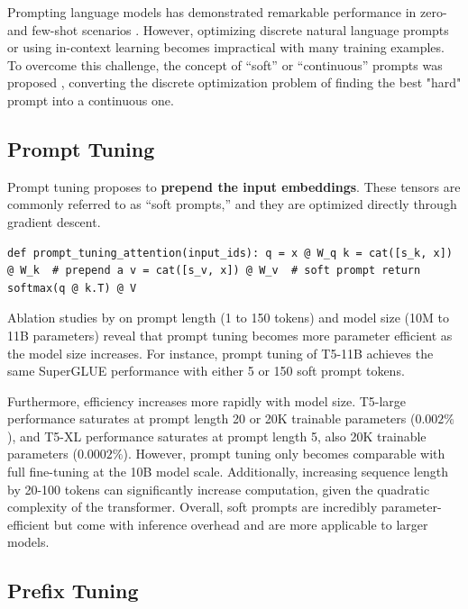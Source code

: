 Prompting language models has demonstrated remarkable performance in zero- and few-shot scenarios \citep{brown2020language_gpt3,pet}. However, optimizing discrete natural language prompts or using in-context learning becomes impractical with many training examples. To overcome this challenge, the concept of ``soft'' or ``continuous'' prompts was proposed \citep{prefix_tuning,prompt_tuning,p_tuning}, converting the discrete optimization problem of finding the best "hard" prompt into a continuous one.

\subsection{Prompt Tuning}
\label{sec:prompt_tuning}

Prompt tuning \citep{prompt_tuning} proposes to \textbf{prepend the input embeddings}. These tensors are commonly referred to as ``soft prompts,'' and they are optimized directly through gradient descent.

\begin{lstlisting}
def prompt_tuning_attention(input_ids): q = x @ W_q k = cat([s_k, x]) @ W_k  # prepend a v = cat([s_v, x]) @ W_v  # soft prompt return softmax(q @ k.T) @ V
\end{lstlisting}

Ablation studies by \citet{promspt_mapping} on prompt length (1 to 150 tokens) and model size (10M to 11B parameters) reveal that prompt tuning becomes more parameter efficient as the model size increases. For instance, prompt tuning of T5-11B achieves the same SuperGLUE \citep{wang2019superglue} performance with either 5 or 150 soft prompt tokens.

Furthermore, efficiency increases more rapidly with model size. T5-large performance saturates at prompt length 20 or 20K trainable parameters ($0.002\%$), and T5-XL performance saturates at prompt length 5, also 20K trainable parameters ($0.0002\%$). However, prompt tuning only becomes comparable with full fine-tuning at the 10B model scale. Additionally, increasing sequence length by 20-100 tokens can significantly increase computation, given the quadratic complexity of the transformer. Overall, soft prompts are incredibly parameter-efficient but come with inference overhead and are more applicable to larger models.

\subsection{Prefix Tuning}
\label{sec:prefix_tuning}

